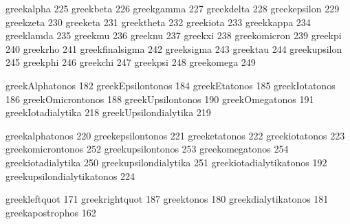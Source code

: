  greekalpha        225
 greekbeta         226
 greekgamma        227
 greekdelta        228
 greekepsilon      229
 greekzeta         230
 greeketa          231
 greektheta        232
 greekiota         233
 greekkappa        234
 greeklamda        235
 greekmu           236
 greeknu           237
 greekxi           238
 greekomicron      239
 greekpi           240
 greekrho          241
 greekfinalsigma   242
 greeksigma        243
 greektau          244
 greekupsilon      245
 greekphi          246
 greekchi          247
 greekpsi          248
 greekomega        249


 greekAlphatonos        182
 greekEpsilontonos      184
 greekEtatonos          185
 greekIotatonos         186
 greekOmicrontonos      188
 greekUpsilontonos      190
 greekOmegatonos        191
 greekIotadialytika     218
 greekUpsilondialytika  219


 greekalphatonos             220
 greekepsilontonos           221
 greeketatonos               222
 greekiotatonos              223
 greekomicrontonos           252
 greekupsilontonos           253
 greekomegatonos             254
 greekiotadialytika          250
 greekupsilondialytika       251
 greekiotadialytikatonos     192
 greekupsilondialytikatonos  224


 greekleftquot               171
 greekrightquot              187
 greektonos                  180
 greekdialytikatonos         181
 greekapostrophos            162

\stopencoding
